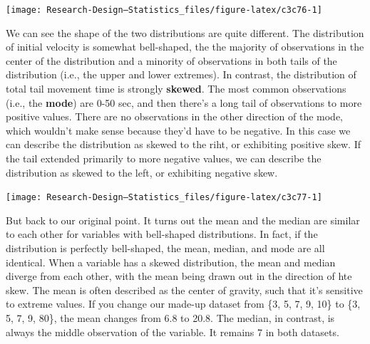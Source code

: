 \documentclass[
]{book}
\newenvironment{Shaded}{\begin{snugshade}}{\end{snugshade}}
\newcommand{\AttributeTok}[1]{\textcolor[rgb]{0.13,0.29,0.53}{#1}}
\newcommand{\ConstantTok}[1]{\textcolor[rgb]{0.56,0.35,0.01}{#1}}
\newcommand{\DecValTok}[1]{\textcolor[rgb]{0.00,0.00,0.81}{#1}}
\newcommand{\FunctionTok}[1]{\textcolor[rgb]{0.13,0.29,0.53}{\textbf{#1}}}
\newcommand{\NormalTok}[1]{#1}
\newcommand{\SpecialCharTok}[1]{\textcolor[rgb]{0.81,0.36,0.00}{\textbf{#1}}}
\newcommand{\StringTok}[1]{\textcolor[rgb]{0.31,0.60,0.02}{#1}}
\begin{document}
\begin{center}\texttt{[image: Research-Design---Statistics\_files/figure-latex/c3c76-1]} \end{center}

We can see the shape of the two distributions are quite different. The distribution of initial velocity is somewhat bell-shaped, the the majority of observations in the center of the distribution and a minority of observations in both tails of the distribution (i.e., the upper and lower extremes). In contrast, the distribution of total tail movement time is strongly \textbf{skewed}. The most common observations (i.e., the \textbf{mode}) are 0-50 sec, and then there's a long tail of observations to more positive values. There are no observations in the other direction of the mode, which wouldn't make sense because they'd have to be negative. In this case we can describe the distribution as skewed to the riht, or exhibiting positive skew. If the tail extended primarily to more negative values, we can describe the distribution as skewed to the left, or exhibiting negative skew.

\begin{Shaded}
\end{Shaded}

\begin{center}\texttt{[image: Research-Design---Statistics\_files/figure-latex/c3c77-1]} \end{center}

But back to our original point. It turns out the mean and the median are similar to each other for variables with bell-shaped distributions. In fact, if the distribution is perfectly bell-shaped, the mean, median, and mode are all identical. When a variable has a skewed distribution, the mean and median diverge from each other, with the mean being drawn out in the direction of hte skew. The mean is often described as the center of gravity, such that it's sensitive to extreme values. If you change our made-up dataset from \{3, 5, 7, 9, 10\} to \{3, 5, 7, 9, 80\}, the mean changes from 6.8 to 20.8. The median, in contrast, is always the middle observation of the variable. It remains 7 in both datasets.
\end{document}
